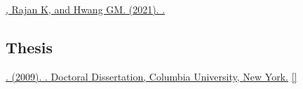 \begin{description}[itemsep=9pt]
  \item \href{https://arxiv.org/abs/2105.07284}
    {, Rajan K, and Hwang GM. (2021). .
    }
\end{description}

\subsection*{Thesis}
\label{sec:thesis}
\vspace{-0.1in}

\begin{description}[itemsep=9pt]
  \item \href{https://jdmonaco.com/files/monaco-phdthesis-2009.pdf}
    {. (2009). . Doctoral Dissertation, Columbia University, New York.}
  \href{https://search.proquest.com/docview/304862872/abstract}
  {}
  \href{https://jdmonaco.com/files/monaco-phdthesis-2009.pdf}{[]}
\end{description}

